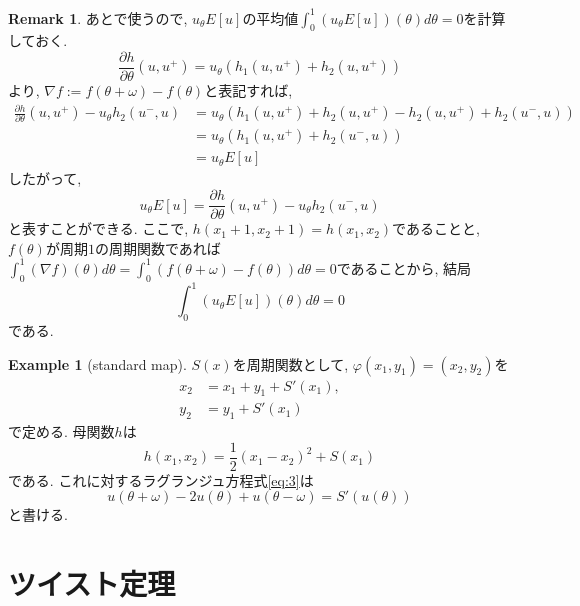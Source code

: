 \documentclass[a4paper]{ujarticle}
\numberwithin{equation}{section}
\theoremstyle{definition}
\newtheorem{example}{Example}
\newtheorem{remark}{Remark}
\begin{document}
        \begin{remark}
            あとで使うので, $u_{\theta} E[u]$の平均値$\displaystyle \int^{1}_{0} (u_{\theta} E[u])(\theta) d \theta = 0$を計算しておく.
            \[
                \frac{\partial h}{\partial \theta}(u, u^{+}) = u_{\theta} (h_1(u, u^{+}) + h_2(u, u^{+}))
            \]
            より, $\nabla f := f(\theta + \omega) - f(\theta)$と表記すれば,
            \begin{align}
                \frac{\partial h}{\partial \theta}(u, u^{+}) - u_{\theta} h_2(u^{-}, u)
                &= u_{\theta} (h_1(u, u^{+}) + h_2(u, u^{+}) - h_2(u, u^{+}) + h_2(u^{-}, u)) \\
                &= u_{\theta} (h_1(u, u^{+}) + h_2(u^{-}, u)) \\
                &= u_{\theta} E[u]
            \end{align}
            したがって, 
            \[
                u_{\theta} E[u] = \frac{\partial h}{\partial \theta}(u, u^{+}) - u_{\theta} h_2(u^{-}, u)
            \]
            と表すことができる.
            ここで, $h(x_1+1, x_2 + 1) = h(x_1, x_2)$であることと, 
            $f(\theta)$が周期$1$の周期関数であれば$\displaystyle \int^{1}_{0} (\nabla f)(\theta) d \theta = \int^{1}_{0} (f(\theta + \omega) - f(\theta)) d \theta = 0$であることから,
            結局
            \[
                \int^{1}_{0} (u_{\theta} E[u])(\theta) d \theta = 0
            \]
            である.

        \end{remark}

        \begin{example}[standard map]
            $S(x)$を周期関数として, $\varphi(x_1, y_1) = (x_2, y_2)$を
            \begin{align}
                x_2 &= x_1 + y_1 + S'(x_1), \\
                y_2 &= y_1 + S'(x_1)
            \end{align}
            で定める. 母関数$h$は
            \[
                h(x_1, x_2) = \frac{1}{2}(x_1 - x_2)^2 + S(x_1)
            \]
            である. これに対するラグランジュ方程式\eqref{eq:3}は
            \[
                u(\theta + \omega) - 2 u(\theta) + u(\theta - \omega) = S'(u(\theta))
            \]
            と書ける.
        \end{example}

    \section{ツイスト定理}
\end{document}
